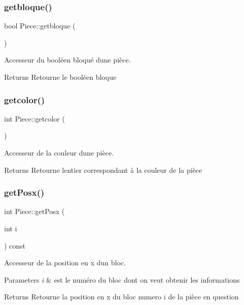 \subsubsection{\texorpdfstring{getbloque()}{getbloque()}}
{\footnotesize\ttfamily bool Piece\+::getbloque (\begin{DoxyParamCaption}{ }\end{DoxyParamCaption})}



Accesseur du booléen bloqué d\textquotesingle{}une pièce. 

\begin{DoxyReturn}{Returns}
Retourne le booléen bloque 
\end{DoxyReturn}
\mbox{\label{classPiece_a2160d48bd04821ebbab32e14728360ad}} 
\subsubsection{\texorpdfstring{getcolor()}{getcolor()}}
{\footnotesize\ttfamily int Piece\+::getcolor (\begin{DoxyParamCaption}{ }\end{DoxyParamCaption})}



Accesseur de la couleur d\textquotesingle{}une pièce. 

\begin{DoxyReturn}{Returns}
Retourne l\textquotesingle{}entier correspondant à la couleur de la pièce 
\end{DoxyReturn}
\mbox{\label{classPiece_a0af5276d26a4bb2a6a42a3dab8b4783f}} 
\subsubsection{\texorpdfstring{get\+Posx()}{getPosx()}}
{\footnotesize\ttfamily int Piece\+::get\+Posx (\begin{DoxyParamCaption}\item[{int}]{i }\end{DoxyParamCaption}) const}



Accesseur de la position en x d\textquotesingle{}un bloc. 


\begin{DoxyParams}{Parameters}
{\em i} & est le numéro du bloc dont on veut obtenir les informations \\
\hline
\end{DoxyParams}
\begin{DoxyReturn}{Returns}
Retourne la position en x du bloc numero i de la pièce en question 
\end{DoxyReturn}
\mbox{\label{classPiece_a24ca14604d394b821bf89d690c6de477}} 
